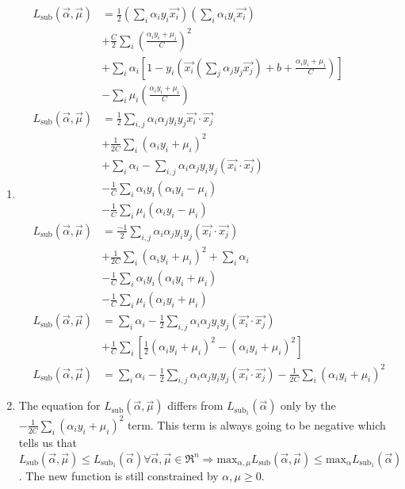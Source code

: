 \documentclass[12pt]{article}
\begin{document}
\begin{enumerate}
\begin{enumerate}
\item %
\begin{align*}
L_{\text{sub}}\left(\vec{\alpha},\vec{\mu}\right) &=
\frac{1}{2}\left( \sum_i \alpha_i y_i \vec{x_i}\right) 
\left( \sum_i \alpha_i y_i \vec{x_i} \right) \\
&+ \frac{C}{2} \sum_i \left( \frac{\alpha_i y_i + \mu_i }{C} \right)^2 \\
&+ \sum_i \alpha_i \left[ 1-y_i \left( \vec{x_i} \left( \sum_j \alpha_j y_j \vec{x_j}\right) + b + \frac{\alpha_i y_i +\mu_i}{C} \right) \right] \\
&- \sum_i \mu_i \left(\frac{\alpha_i y_i + \mu_i}{C}\right) \\
L_{\text{sub}}\left(\vec{\alpha},\vec{\mu}\right) &= \frac{1}{2} \sum_{i,j}\alpha_i \alpha_j y_i y_j \vec{x_i}\cdot \vec{x_j} \\
&+ \frac{1}{2C} \sum_i\left(\alpha_i y_i +\mu_i\right)^2 \\
&+ \sum_i \alpha_i - \sum_{i,j} \alpha_i \alpha_j y_i y_j \left( \vec{x_i} \cdot \vec{x_j}\right) \\
&- \frac{1}{C}\sum_i \alpha_i y_i \left( \alpha_i y_i - \mu_i\right) \\
&- \frac{1}{C}\sum_i \mu_i \left( \alpha_i y_i - \mu_i\right) \\
L_{\text{sub}}\left(\vec{\alpha},\vec{\mu}\right) &= \frac{-1}{2}\sum_{i,j} \alpha_i \alpha_j y_i y_j \left(\vec{x_i} \cdot \vec{x_j}\right) \\
&+ \frac{1}{2C} \sum_i\left(\alpha_i y_i + \mu_i \right)^2 + \sum_i \alpha_i \\
&- \frac{1}{C} \sum_i \alpha_i y_i \left(\alpha_i y_i +\mu_i \right) \\
&- \frac{1}{C} \sum_i \mu_i \left( \alpha_i y_i + \mu_i \right) \\
L_{\text{sub}}\left(\vec{\alpha},\vec{\mu}\right) &= \sum_i \alpha_i - \frac{1}{2} \sum_{i,j} \alpha_i \alpha_j y_i y_j \left( \vec{x_i} \cdot \vec{x_j} \right) \\
&+ \frac{1}{C} \sum_i \left[ \frac{1}{2}\left(\alpha_i y_i + \mu_i \right)^2 - \left( \alpha_i y_i + \mu_i \right)^2\right] \\
L_{\text{sub}}\left(\vec{\alpha},\vec{\mu}\right) &= \sum_i \alpha_i - \frac{1}{2} \sum_{i,j}\alpha_i \alpha_j y_i y_j\left(\vec{x_i}\cdot \vec{x_j}\right) - \frac{1}{2C} \sum_i \left(\alpha_i y_i + \mu_i\right)^2
\end{align*}


\item %
The equation for $L_{\text{sub}}\left(\vec{\alpha},\vec{\mu}\right)$ differs from $L_{\text{sub}_1}\left(\vec{\alpha}\right)$ only by the $- \frac{1}{2C} \sum_i \left(\alpha_i y_i + \mu_i\right)^2$ term. This term is always going to be negative which tells us that $L_{\text{sub}}\left(\vec{\alpha},\vec{\mu}\right) \leq L_{\text{sub}_1}\left(\vec{\alpha}\right) \forall \vec{\alpha},\vec{\mu} \in \Re^n \Rightarrow \text{max}_{\alpha,\mu} L_{\text{sub}}\left(\vec{\alpha},\vec{\mu}\right) \leq \text{max}_\alpha L_{\text{sub}_1}\left(\vec{\alpha}\right)$. The new function is still constrained by $\alpha,\mu \geq 0$.


\end{enumerate}
\end{enumerate}
\end{document}
